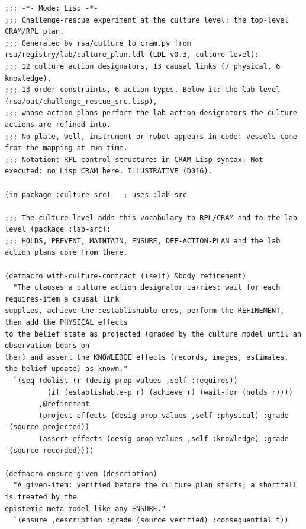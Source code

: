 \documentclass[10.5pt,a4paper]{article}
\begin{document}
\par\vspace{2pt}\begin{Verbatim}[fontsize=\scriptsize,frame=lines,framesep=2mm,breaklines]
;;; -*- Mode: Lisp -*-
;;; Challenge-rescue experiment at the culture level: the top-level CRAM/RPL plan.
;;; Generated by rsa/culture_to_cram.py from rsa/registry/lab/culture_plan.ldl (LDL v0.3, culture level):
;;; 12 culture action designators, 13 causal links (7 physical, 6 knowledge),
;;; 13 order constraints, 6 action types. Below it: the lab level (rsa/out/challenge_rescue_src.lisp),
;;; whose action plans perform the lab action designators the culture actions are refined into.
;;; No plate, well, instrument or robot appears in code: vessels come from the mapping at run time.
;;; Notation: RPL control structures in CRAM Lisp syntax. Not executed: no Lisp CRAM here. ILLUSTRATIVE (D016).

(in-package :culture-src)   ; uses :lab-src

;;; The culture level adds this vocabulary to RPL/CRAM and to the lab level (package :lab-src):
;;; HOLDS, PREVENT, MAINTAIN, ENSURE, DEF-ACTION-PLAN and the lab action plans come from there.

(defmacro with-culture-contract ((self) &body refinement)
  "The clauses a culture action designator carries: wait for each requires-item a causal link
supplies, achieve the :establishable ones, perform the REFINEMENT, then add the PHYSICAL effects
to the belief state as projected (graded by the culture model until an observation bears on
them) and assert the KNOWLEDGE effects (records, images, estimates, the belief update) as known."
  `(seq (dolist (r (desig-prop-values ,self :requires))
          (if (establishable-p r) (achieve r) (wait-for (holds r))))
        ,@refinement
        (project-effects (desig-prop-values ,self :physical) :grade '(source projected))
        (assert-effects (desig-prop-values ,self :knowledge) :grade '(source recorded))))

(defmacro ensure-given (description)
  "A given-item: verified before the culture plan starts; a shortfall is treated by the
epistemic meta model like any ENSURE."
  `(ensure ,description :grade (source verified) :consequential t))
\end{Verbatim}
\end{document}
